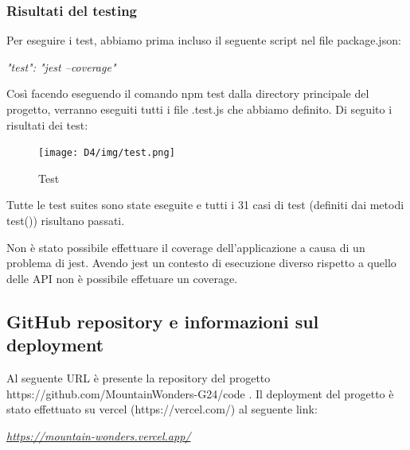 \documentclass[a4paper,12pt]{article}
\begin{document}
\subsubsection{Risultati del testing}
Per eseguire i test, abbiamo prima incluso il seguente script nel file package.json: 
\begin{center} \textit{"test": "jest --coverage"} \end{center}
Così facendo eseguendo il comando npm test dalla directory principale del progetto, verranno eseguiti tutti i file .test.js che abbiamo definito.
\newline
Di seguito i risultati dei test: 
\begin{figure}[H]
    \centering
    \texttt{[image: D4/img/test.png]}
    \caption{Test}
\end{figure}
Tutte le test suites sono state eseguite e tutti i 31 casi di test (definiti dai metodi test()) risultano passati.

Non è stato possibile effettuare il coverage dell'applicazione a causa di un problema di jest. Avendo jest un contesto di esecuzione diverso rispetto a quello delle API non è possibile effetuare un coverage. 
\newpage
\subsection{GitHub repository e informazioni sul deployment}
Al seguente URL è presente la repository del progetto https://github.com/MountainWonders-G24/code .
\newline
\newline
\newline
Il deployment del progetto è stato effettuato su vercel (https://vercel.com/) al seguente link:
\begin{center} \textit{\url{ https://mountain-wonders.vercel.app/ }} \end{center}
\end{document}

